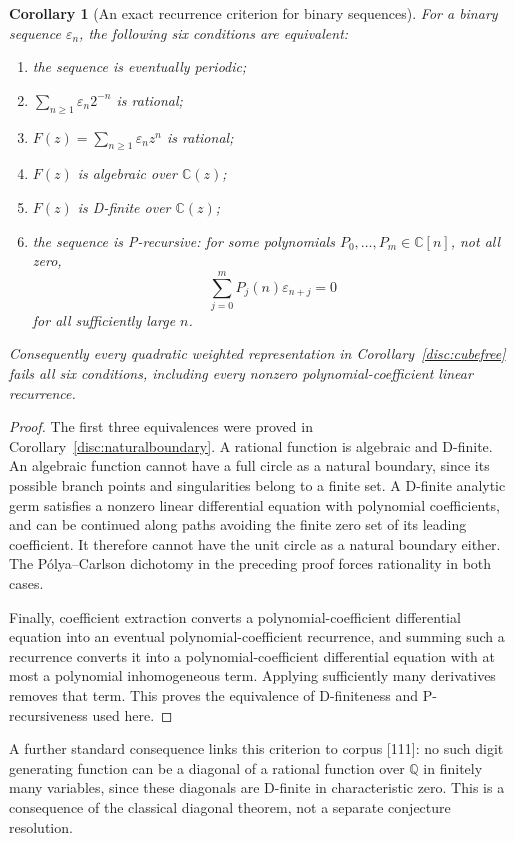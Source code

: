 \documentclass[11pt,a4paper]{article}
\newtheorem{corollary}[theorem]{Corollary}
\theoremstyle{definition}
\theoremstyle{remark}
\numberwithin{equation}{section}
\begin{document}
\begin{corollary}[An exact recurrence criterion for binary sequences]
\label{disc:recurrencecriterion}
For a binary sequence $\varepsilon_n$, the following six conditions
are equivalent:
\begin{enumerate}[label=\textup{(\roman*)}]
\item the sequence is eventually periodic;
\item $\sum_{n\ge1}\varepsilon_n2^{-n}$ is rational;
\item $F(z)=\sum_{n\ge1}\varepsilon_nz^n$ is rational;
\item $F(z)$ is algebraic over $\mathbb C(z)$;
\item $F(z)$ is D-finite over $\mathbb C(z)$;
\item the sequence is P-recursive: for some polynomials
$P_0,\ldots,P_m\in\mathbb C[n]$, not all zero,
\[
 \sum_{j=0}^mP_j(n)\varepsilon_{n+j}=0
\]
for all sufficiently large $n$.
\end{enumerate}
Consequently every quadratic weighted representation in
Corollary~\ref{disc:cubefree} fails all six conditions, including every
nonzero polynomial-coefficient linear recurrence.
\end{corollary}

\begin{proof}
The first three equivalences were proved in
Corollary~\ref{disc:naturalboundary}.  A rational function is algebraic
and D-finite.  An algebraic function cannot have a full circle as a
natural boundary, since its possible branch points and singularities
belong to a finite set.  A D-finite analytic germ satisfies a nonzero
linear differential equation with polynomial coefficients, and can be
continued along paths avoiding the finite zero set of its leading
coefficient.  It therefore cannot have the unit circle as a natural
boundary either.  The P\'olya--Carlson dichotomy in the preceding proof
forces rationality in both cases.

Finally, coefficient extraction converts a polynomial-coefficient
differential equation into an eventual polynomial-coefficient recurrence,
and summing such a recurrence converts it into a polynomial-coefficient
differential equation with at most a polynomial inhomogeneous term.
Applying sufficiently many derivatives removes that term.  This proves
the equivalence of D-finiteness and P-recursiveness used here.
\end{proof}

A further standard consequence links this criterion to corpus [111]:
no such digit generating function can be a diagonal of a rational
function over $\mathbb Q$ in finitely many variables, since these
diagonals are D-finite in characteristic zero.  This is a consequence
of the classical diagonal theorem, not a separate conjecture resolution.
\end{document}
